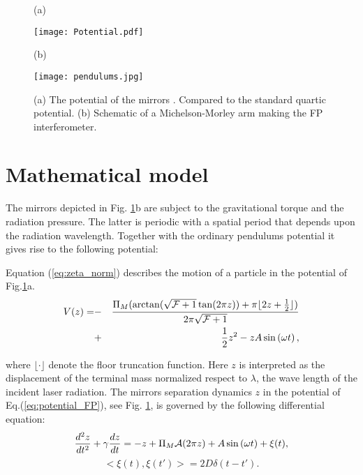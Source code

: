 \documentclass[conference]{IEEEtran}
\newcommand{\beq}{\begin{equation}}
\newcommand{\eeq}{\end{equation}}
\begin{document}
\begin{figure}[t]
\centering
\centerline{(a)}
\texttt{[image: Potential.pdf]}
\vspace{0.5cm}\phantom{$d=0$}
\centerline{(b)}
\texttt{[image: pendulums.jpg]}
\caption{(a) The potential of the mirrors . Compared to the standard quartic potential. (b) Schematic of a Michelson-Morley arm making the FP interferometer.
}
\label{fig:potential}
\end{figure}

\section{Mathematical model}
\label{sect:model}

The mirrors depicted in Fig. \ref{fig:potential}b are  subject to the gravitational torque and the radiation pressure. The latter is periodic with a spatial period that depends upon the radiation wavelength. Together with the ordinary pendulums potential it gives rise to the following potential:

Equation (\ref{eq:zeta_norm}) describes the motion of a particle in the potential of Fig.\ref{fig:potential}a.
\begin{eqnarray}
V(z)= & - & \frac{\Pi_M (
	\arctan (\sqrt{{\cal F}+1} \tan(2\pi  z)
	)+ \pi \lfloor 2 z+\frac{1}{2}\rfloor )}
{2 \pi 
   \sqrt{{\cal F}+1}}   \nonumber \\
& + & \frac{1}{2} z^2    -z A  \sin \left(\omega t \right),
   \label{eq:potential_FP}
\end{eqnarray}

\noindent where $\lfloor \cdot \rfloor$ denote the floor truncation function.
Here $z$ is interpreted as the displacement of the terminal mass normalized respect to $\lambda$, the wave length of the incident laser radiation. 
The mirrors separation dynamics $z$ in the potential of Eq.(\ref{eq:potential_FP}), see Fig. \ref{fig:potential}, is governed by the following differential equation:
\beq
\frac{d^2z}{dt^2} + \gamma \frac{dz}{dt} = - z + \Pi_{M}{\cal A}(2\pi z) 
+ A \sin\left( \omega t \right) +  \xi(t),
\label{eq:zeta_norm}
\eeq
\beq
< \xi(t),\xi(t')> = 2D\delta(t-t').
\label{eq:correlator}
\eeq
\noindent 
\end{document}
